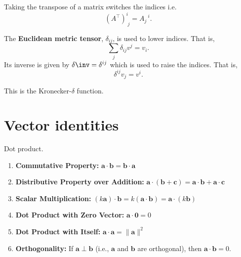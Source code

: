 \documentclass[12pt, a4paper]{article}
\begin{document}
\begin{definition}
    Taking the transpose of a matrix switches the indices i.e.\ 
    \[(A^{\top})^i_{\; j} = A_j^{\; \;\,i}.\]
\end{definition}

\begin{definition}
    The \textbf{Euclidean metric tensor}, \(\delta_{ij}\), is used to lower indices. That is,
    \[ \sum_j \delta_{ij}v^{j} = v_i.\]
    Its inverse is given by \(\delta\inv= \delta^{ij}\) which is used to raise the indices. That is,
    \[\delta^{ij} v_j = v^{i}.\]
\end{definition}

\begin{mdnote}
    This is the Kronecker-\(\delta\) function.
\end{mdnote}

\section{Vector identities}

\begin{mdprop}
    Dot product.
    \begin{enumerate}
        \item \textbf{Commutative Property:} \( \bm{a} \cdot \bm{b} = \bm{b} \cdot \bm{a} \)
        
        \item \textbf{Distributive Property over Addition:} \( \bm{a} \cdot (\bm{b} + \bm{c}) = \bm{a} \cdot \bm{b} + \bm{a} \cdot \bm{c} \)
        
        \item \textbf{Scalar Multiplication:} \( (k \bm{a}) \cdot \bm{b} = k (\bm{a} \cdot \bm{b}) = \bm{a} \cdot (k \bm{b}) \)
        
        \item \textbf{Dot Product with Zero Vector:} \( \bm{a} \cdot \bm{0} = 0 \)
        
        \item \textbf{Dot Product with Itself:} \( \bm{a} \cdot \bm{a} = \|\bm{a}\|^2 \)
        
        \item \textbf{Orthogonality:} If \( \bm{a} \perp \bm{b} \) (i.e., \( \bm{a} \) and \( \bm{b} \) are orthogonal), then \( \bm{a} \cdot \bm{b} = 0 \).
    \end{enumerate}
\end{mdprop}
\end{document}

